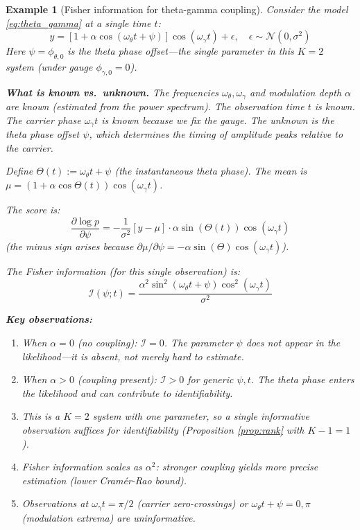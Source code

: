 \documentclass[12pt]{article}
\newtheorem{example}[theorem]{Example}
\newcommand{\FIM}{\mathcal{I}}
\begin{document}
\begin{example}[Fisher information for theta-gamma coupling]
\label{ex:theta_gamma}
Consider the model \eqref{eq:theta_gamma} at a single time $t$:
\begin{equation}
y = [1 + \alpha \cos(\omega_\theta t + \psi)] \cos(\omega_\gamma t) + \epsilon, \quad \epsilon \sim \mathcal{N}(0, \sigma^2)
\end{equation}
Here $\psi = \phi_{\theta,0}$ is the theta phase offset---the single parameter in this $K=2$ system (under gauge $\phi_{\gamma,0} = 0$).

\textbf{What is known vs.\ unknown.} The frequencies $\omega_\theta, \omega_\gamma$ and modulation depth $\alpha$ are known (estimated from the power spectrum). The observation time $t$ is known. The carrier phase $\omega_\gamma t$ is known because we fix the gauge. The unknown is the \emph{theta phase offset} $\psi$, which determines the timing of amplitude peaks relative to the carrier.

Define $\Theta(t) := \omega_\theta t + \psi$ (the instantaneous theta phase). The mean is $\mu = (1 + \alpha\cos\Theta(t))\cos(\omega_\gamma t)$.

The score is:
\begin{equation}
\frac{\partial \log p}{\partial \psi} = -\frac{1}{\sigma^2}[y - \mu] \cdot \alpha \sin(\Theta(t)) \cos(\omega_\gamma t)
\end{equation}
(the minus sign arises because $\partial\mu/\partial\psi = -\alpha\sin(\Theta)\cos(\omega_\gamma t)$).

The Fisher information (for this single observation) is:
\begin{equation}
\FIM(\psi; t) = \frac{\alpha^2 \sin^2(\omega_\theta t + \psi) \cos^2(\omega_\gamma t)}{\sigma^2}
\label{eq:fim_example}
\end{equation}

\textbf{Key observations:}
\begin{enumerate}
    \item When $\alpha = 0$ (no coupling): $\FIM = 0$. The parameter $\psi$ \emph{does not appear} in the likelihood---it is absent, not merely hard to estimate.

    \item When $\alpha > 0$ (coupling present): $\FIM > 0$ for generic $\psi, t$. The theta phase \emph{enters} the likelihood and can contribute to identifiability.

    \item This is a $K=2$ system with one parameter, so a single informative observation suffices for identifiability (Proposition \ref{prop:rank} with $K-1 = 1$).

    \item Fisher information scales as $\alpha^2$: stronger coupling yields more precise estimation (lower Cramér-Rao bound).

    \item Observations at $\omega_\gamma t = \pi/2$ (carrier zero-crossings) or $\omega_\theta t + \psi = 0, \pi$ (modulation extrema) are uninformative.
\end{enumerate}
\end{example}
\end{document}
